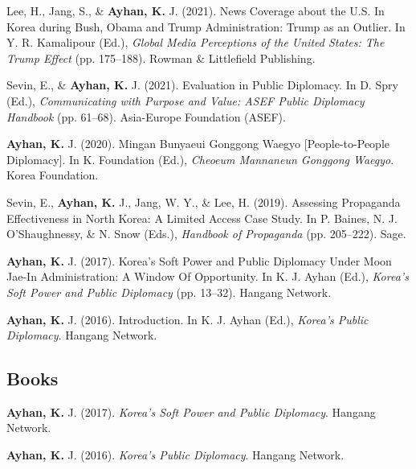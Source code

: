\documentclass[11pt,a4paper,]{awesome-cv}
\begin{document}
\leavevmode{}%
Lee, H., Jang, S., \& \textbf{Ayhan, K.} J. (2021). News {Coverage}
about the {U}.{S}. In {Korea} during {Bush}, {Obama} and {Trump}
{Administration}: {Trump} as an {Outlier}. In Y. R. Kamalipour (Ed.),
\emph{Global {Media} {Perceptions} of the {United} {States}: {The}
{Trump} {Effect}} (pp. 175--188). Rowman \& Littlefield Publishing.

\leavevmode{}%
Sevin, E., \& \textbf{Ayhan, K.} J. (2021). Evaluation in {Public}
{Diplomacy}. In D. Spry (Ed.), \emph{Communicating with {Purpose} and
{Value}: {ASEF} {Public} {Diplomacy} {Handbook}} (pp. 61--68).
Asia-Europe Foundation (ASEF).

\leavevmode{}%
\textbf{Ayhan, K.} J. (2020). Mingan {Bunyaeui} {Gonggong} {Waegyo}
{[}{People}-to-{People} {Diplomacy}{]}. In K. Foundation (Ed.),
\emph{Cheoeum {Mannaneun} {Gonggong} {Waegyo}}. Korea Foundation.

\leavevmode{}%
Sevin, E., \textbf{Ayhan, K.} J., Jang, W. Y., \& Lee, H. (2019).
Assessing {Propaganda} {Effectiveness} in {North} {Korea}: {A} {Limited}
{Access} {Case} {Study}. In P. Baines, N. J. O'Shaughnessy, \& N. Snow
(Eds.), \emph{Handbook of {Propaganda}} (pp. 205--222). Sage.

\leavevmode{}%
\textbf{Ayhan, K.} J. (2017). Korea's {Soft} {Power} and {Public}
{Diplomacy} {Under} {Moon} {Jae}-{In} {Administration}: {A} {Window}
{Of} {Opportunity}. In K. J. Ayhan (Ed.), \emph{Korea's {Soft} {Power}
and {Public} {Diplomacy}} (pp. 13--32). Hangang Network.

\leavevmode{}%
\textbf{Ayhan, K.} J. (2016). Introduction. In K. J. Ayhan (Ed.),
\emph{Korea's {Public} {Diplomacy}}. Hangang Network.

\hypertarget{books}{%
\subsection{Books}\label{books}}

\hypertarget{refs_books}{}
\leavevmode{}%
\textbf{Ayhan, K.} J. (2017). \emph{Korea's {Soft} {Power} and {Public}
{Diplomacy}}. Hangang Network.

\leavevmode{}%
\textbf{Ayhan, K.} J. (2016). \emph{Korea's {Public} {Diplomacy}}.
Hangang Network.
\end{document}
